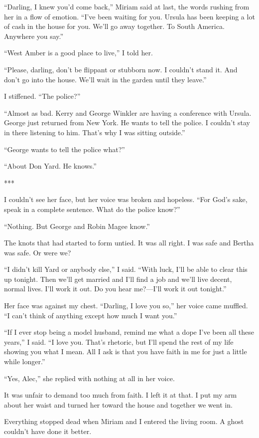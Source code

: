 \documentclass{novel}
\begin{document}
“Darling, I knew you’d come back,” Miriam said at last, the words rushing from her in a flow of emotion. “I’ve been waiting for you. Ursula has been keeping a lot of cash in the house for you. We’ll go away together. To South America. Anywhere you say.”

“West Amber is a good place to live,” I told her.

“Please, darling, don’t be flippant or stubborn now. I couldn’t stand it. And don’t go into the house. We’ll wait in the garden until they leave.”

I stiffened. “The police?”

“Almost as bad. Kerry and George Winkler are having a conference with Ursula. George just returned from New York. He wants to tell the police. I couldn’t stay in there listening to him. That’s why I was sitting outside.”

“George wants to tell the police what?”

“About Don Yard. He knows.”

***

I couldn’t see her face, but her voice was broken and hopeless. “For God’s sake, speak in a complete sentence. What do the police know?”

“Nothing. But George and Robin Magee know.”

The knots that had started to form untied. It was all right. I was safe and Bertha was safe. Or were we?

“I didn’t kill Yard or anybody else,” I said. “With luck, I’ll be able to clear this up tonight. Then we’ll get married and I’ll find a job and we’ll live decent, normal lives. I’ll work it out. Do you hear me?—I’ll work it out tonight.”

Her face was against my chest. “Darling, I love you so,” her voice came muffled. “I can’t think of anything except how much I want you.”

“If I ever stop being a model husband, remind me what a dope I’ve been all these years,” I said. “I love you. That’s rhetoric, but I’ll spend the rest of my life showing you what I mean. All I ask is that you have faith in me for just a little while longer.”

“Yes, Alec,” she replied with nothing at all in her voice.

It was unfair to demand too much from faith. I left it at that. I put my arm about her waist and turned her toward the house and together we went in.

Everything stopped dead when Miriam and I entered the living room. A ghost couldn’t have done it better.
\end{document}
